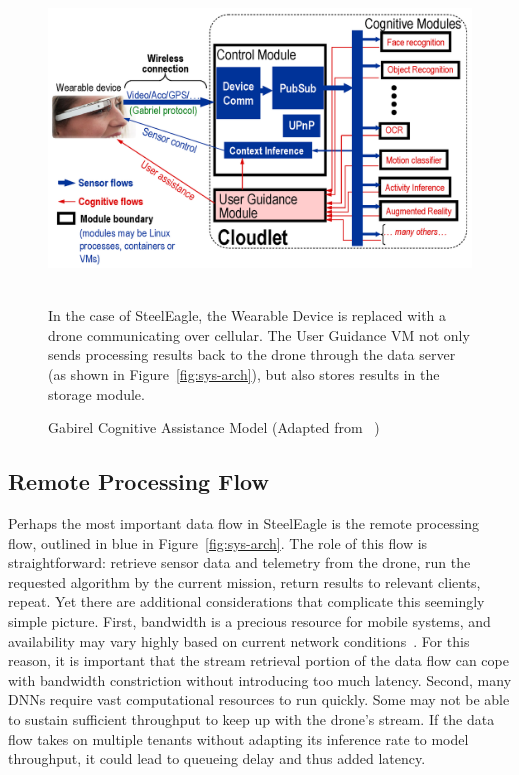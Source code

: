 \begin{figure}
    \centering
    \includegraphics[width=0.8\linewidth]{chapter4/FIGS/gabriel.png}
    \begin{captext}
    \\[0.1cm]
    \small In the case of SteelEagle, the Wearable Device is replaced with a drone communicating over cellular. The User Guidance VM not only sends processing results back to the drone through the data server (as shown in Figure~\ref{fig:sys-arch}), but also stores results in the storage module.
    \end{captext}
    \caption{Gabirel Cognitive Assistance Model (Adapted from ~\cite{Ha2014})}
    \label{fig:gabriel-cognitive-assistance}
\end{figure}


\subsection{Remote Processing Flow}
Perhaps the most important data flow in SteelEagle is the remote processing flow, outlined in blue in Figure~\ref{fig:sys-arch}. The role of this flow is straightforward: retrieve sensor data and telemetry from the drone, run the requested algorithm by the current mission, return results to relevant clients, repeat. Yet there are additional considerations that complicate this seemingly simple picture. First, bandwidth is a precious resource for mobile systems, and availability may vary highly based on current network conditions~\cite{Forman1994}. For this reason, it is important that the stream retrieval portion of the data flow can cope with bandwidth constriction without introducing too much latency. Second, many DNNs require vast computational resources to run quickly. Some may not be able to sustain sufficient throughput to keep up with the drone's stream. If the data flow takes on multiple tenants without adapting its inference rate to model throughput, it could lead to queueing delay and thus added latency.

